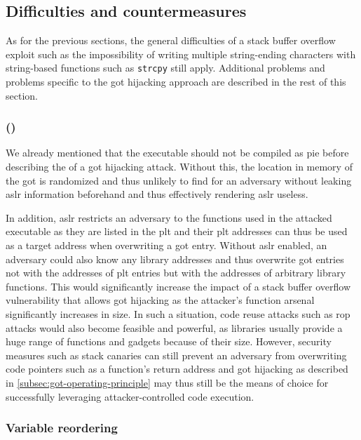 \subsection{Difficulties and countermeasures}
\label{subsec:got-countermeasures}

As for the previous sections, the general difficulties of a stack buffer overflow exploit such as the impossibility of writing multiple string-ending characters with string-based functions such as \texttt{strcpy} still apply.
Additional problems and problems specific to the \gls{got} hijacking approach are described in the rest of this section.

\subsubsection{ ()}
\label{subsubsec:got-aslr}

We already mentioned that the executable should not be compiled as \gls{pie} before describing the  of a \gls{got} hijacking attack.
Without this, the location in memory of the \gls{got} is randomized and thus unlikely to find for an adversary without leaking \gls{aslr} information beforehand and thus effectively rendering \gls{aslr} useless.

In addition, \gls{aslr} restricts an adversary to the functions used in the attacked executable as they are listed in the \gls{plt} and their \gls{plt} addresses can thus be used as a target address when overwriting a \gls{got} entry.
Without \gls{aslr} enabled, an adversary could also know any library addresses and thus overwrite \gls{got} entries not with the addresses of \gls{plt} entries but with the addresses of arbitrary library functions.
This would significantly increase the impact of a stack buffer overflow vulnerability that allows \gls{got} hijacking as the attacker's function arsenal significantly increases in size.
In such a situation, code reuse attacks such as \gls{rop} attacks would also become feasible and powerful, as libraries usually provide a huge range of functions and gadgets because of their size.
However, security measures such as stack canaries can still prevent an adversary from overwriting code pointers such as a function's return address and \gls{got} hijacking as described in \cref{subsec:got-operating-principle} may thus still be the means of choice for successfully leveraging attacker-controlled code execution.

\subsubsection{Variable reordering}
\label{subsubsec:got-variable-reordering}

